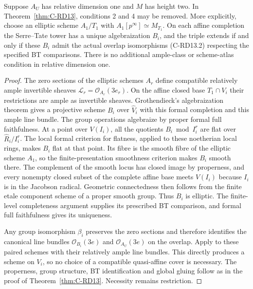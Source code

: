 \begin{corollary}
\label{cor:C-RD14}
Suppose $A_U$ has relative dimension one and $M$ has height two. In Theorem~\ref{thm:C-RD13}, conditions 2 and 4 may be
removed. More explicitly, choose an elliptic scheme $A_1/T_1$ with
$A_1[p^\infty]\simeq M_{T_1}$. On each affine completion the
Serre--Tate tower has a unique algebraization $B_i$, and the triple
extends if and only if these $B_i$ admit the actual overlap
isomorphisms (C-RD13.2) respecting the specified BT comparisons.
There is no additional ample-class or scheme-atlas condition in
relative dimension one.
\end{corollary}
\begin{proof}
The zero sections of the elliptic schemes $A_r$ define compatible
relatively ample invertible sheaves
$\mathcal L_r=\mathcal O_{A_r}(3e_r)$. On the affine closed base
$T_1\cap V_i$ their restrictions are ample as invertible sheaves.
Grothendieck's algebraization theorem
\cite[Theorem~5.4.5, pp.157--158]{EGAIII1} gives a projective scheme $B_i$ over
$\widehat V_i$ with this formal completion and this ample line
bundle. The group operations algebraize by proper formal full
faithfulness. At a point over $V(I_i)$, all the quotients
$B_i\bmod I_i^r$ are flat over $\widehat R_i/I_i^r$. The local
formal criterion for flatness, applied to these noetherian local
rings, makes $B_i$ flat at that point. Its fibre is the smooth
fibre of the elliptic scheme $A_1$, so the finite-presentation
smoothness criterion makes $B_i$ smooth there. The complement
of the smooth locus has closed image by properness, and every
nonempty closed subset of the complete affine
base meets $V(I_i)$ because $I_i$ is in the Jacobson radical.
Geometric connectedness then follows from the finite etale
component scheme of a proper smooth group. Thus $B_i$ is elliptic.
The finite-level completeness argument supplies its prescribed BT
comparison, and formal full faithfulness gives its uniqueness.

Any group isomorphism $\beta_i$ preserves the zero sections and
therefore identifies the canonical line bundles
$\mathcal O_{B_i}(3e)$ and $\mathcal O_{A_U}(3e)$ on the overlap.
Apply \cite[Theorem~1.1, the QPROJ case, p.565]{MoretBailly1996Descent}
to these paired schemes with their relatively ample line bundles.
This directly produces a scheme on $V_i$, so no choice of a
compatible quasi-affine cover is necessary. The properness, group
structure, BT identification and global gluing follow as in the
proof of Theorem~\ref{thm:C-RD13}. Necessity remains restriction.
\end{proof}

